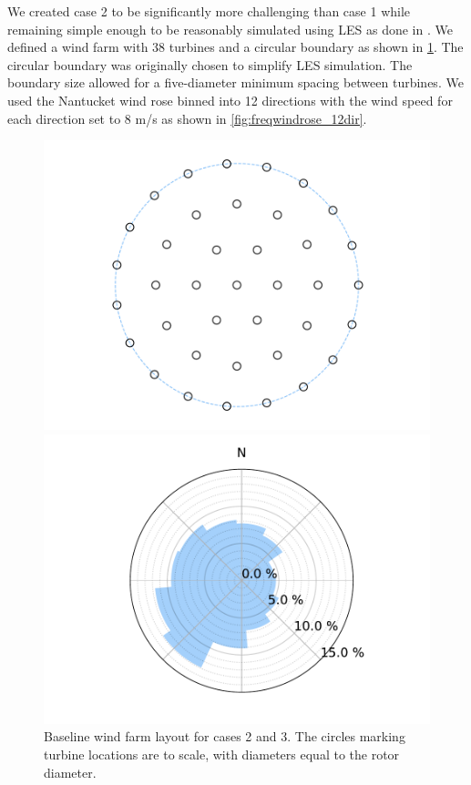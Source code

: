 \documentclass{jpconf}
\begin{document}
  We created case 2 to be significantly more challenging than case 1 while remaining simple enough to be reasonably simulated using LES as done in \cite{thomas2019-les-validation}. We defined a wind farm with 38 turbines and a circular boundary as shown in \cref{fig:layout2and3}. The circular boundary was originally chosen to simplify LES simulation. The boundary size allowed for a five-diameter minimum spacing between turbines. We used the Nantucket wind rose binned into 12 directions with the wind speed for each direction set to 8 m/s as shown in \cref{fig:freqwindrose_12dir}.
%
\begin{figure}[h!]
	\centering
	\begin{minipage}[t]{18pc}
		\centering
		\includegraphics[width=\textwidth, trim={1.5cm, 0cm, 1.5cm, 0cm}, clip]{final_images/layouts/38_turb_start.pdf}
		\caption{Baseline wind farm layout for cases 2 and 3. The circles marking turbine locations are to scale, with diameters equal to the rotor diameter.}
		\label{fig:layout2and3}
	\end{minipage} \hspace{1pc}
	\begin{minipage}[t]{18pc}
		\centering
		\includegraphics[width=\textwidth, trim={1.5cm 0cm 1.5cm 0cm}, clip]{final_images/windroses/freqwindrose_12_dir.pdf}

\end{minipage}
\end{figure}
\end{document}
